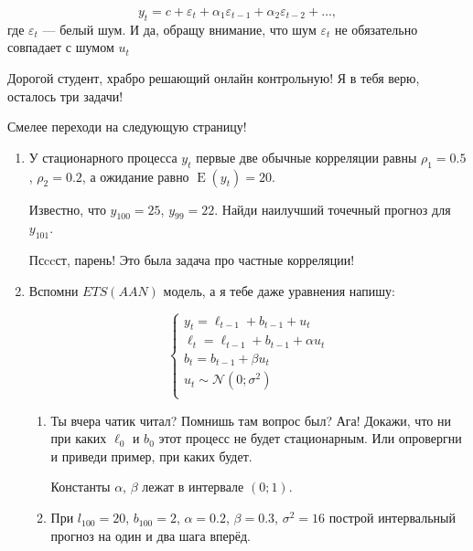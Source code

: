 \documentclass[12pt]{article}
\DeclareMathOperator{\E}{E}
\def \cN{\mathcal{N}}
\begin{document}
\begin{enumerate}
\begin{enumerate}
	\[
	y_t = c + \varepsilon_t + \alpha_1 \varepsilon_{t-1} + \alpha_2 \varepsilon_{t-2} + \ldots,
	\]
	где $\varepsilon_t$ — белый шум. 
	И да, обращу внимание, что шум $\varepsilon_t$ не обязательно совпадает с шумом $u_t$
\end{enumerate}

\end{enumerate}

Дорогой студент, храбро решающий онлайн контрольную! Я в тебя верю, осталось три задачи!

Смелее переходи на следующую страницу!
\newpage

\begin{enumerate}[resume]

\item У стационарного процесса $y_t$ первые две обычные корреляции равны $\rho_1 = 0.5$, $\rho_2 = 0.2$,
а ожидание равно $\E(y_t) = 20$. 

Известно, что $y_{100} = 25$, $y_{99} = 22$. Найди наилучший точечный прогноз для $y_{101}$.



Псccст, парень! Это была задача про частные корреляции! 

\item Вспомни $ETS(AAN)$ модель, а я тебе даже уравнения напишу:

\[
\begin{cases}
y_t = \ell_{t-1} + b_{t-1} + u_t \\
\ell_t = \ell_{t-1} + b_{t-1} + \alpha u_t \\
b_t = b_{t-1} + \beta u_t \\
u_t \sim \cN(0;\sigma^2) \\
\end{cases}
\]

\begin{enumerate}
	\item Ты вчера чатик читал? Помнишь там вопрос был? Ага! 
	Докажи, что ни при каких $\ell_0$ и $b_0$ этот процесс не будет стационарным. 
	Или опровергни и приведи пример, при каких будет. 
	
	Константы $\alpha$, $\beta$ лежат в интервале $(0;1)$.
	
	\item При $l_{100} = 20$, $b_{100} = 2$, $\alpha=0.2$, $\beta=0.3$, $\sigma^2 = 16$ построй
	интервальный прогноз на один и два шага вперёд. 
\end{enumerate}




\end{enumerate}
\end{document}
